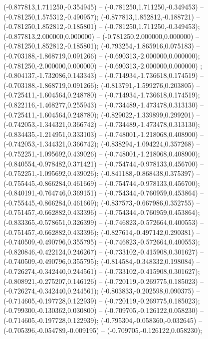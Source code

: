  (-0.877813,1.711250,-0.354945) -- (-0.781250,1.711250,-0.349453) -- (-0.781250,1.575312,-0.490957);
 (-0.877813,1.852812,-0.188721) -- (-0.781250,1.852812,-0.185801) -- (-0.781250,1.711250,-0.349453);
 (-0.877813,2.000000,0.000000) -- (-0.781250,2.000000,0.000000) -- (-0.781250,1.852812,-0.185801);
 (-0.793254,-1.865916,0.075183) -- (-0.703188,-1.868719,0.091266) -- (-0.690313,-2.000000,0.000000);
 (-0.781250,-2.000000,0.000000) -- (-0.690313,-2.000000,0.000000) ;
 (-0.804137,-1.732086,0.143343) -- (-0.714934,-1.736618,0.174519) -- (-0.703188,-1.868719,0.091266);
 (-0.813791,-1.599276,0.203805) -- (-0.725411,-1.604564,0.248780) -- (-0.714934,-1.736618,0.174519);
 (-0.822116,-1.468277,0.255943) -- (-0.734489,-1.473478,0.313130) -- (-0.725411,-1.604564,0.248780);
 (-0.829022,-1.339899,0.299201) -- (-0.742053,-1.344321,0.366742) -- (-0.734489,-1.473478,0.313130);
 (-0.834435,-1.214951,0.333103) -- (-0.748001,-1.218068,0.408900) -- (-0.742053,-1.344321,0.366742);
 (-0.838294,-1.094224,0.357268) -- (-0.752251,-1.095692,0.439026) -- (-0.748001,-1.218068,0.408900);
 (-0.840554,-0.978482,0.371421) -- (-0.754744,-0.978133,0.456700) -- (-0.752251,-1.095692,0.439026);
 (-0.841188,-0.868438,0.375397) -- (-0.755445,-0.866284,0.461669) -- (-0.754744,-0.978133,0.456700);
 (-0.840191,-0.764746,0.369151) -- (-0.754344,-0.760959,0.453864) -- (-0.755445,-0.866284,0.461669);
 (-0.837573,-0.667986,0.352755) -- (-0.751457,-0.662882,0.433396) -- (-0.754344,-0.760959,0.453864);
 (-0.833365,-0.578651,0.326399) -- (-0.746823,-0.572664,0.400553) -- (-0.751457,-0.662882,0.433396);
 (-0.827614,-0.497142,0.290381) -- (-0.740509,-0.490796,0.355795) -- (-0.746823,-0.572664,0.400553);
 (-0.820846,-0.422124,0.246267) -- (-0.733102,-0.415908,0.301627) -- (-0.740509,-0.490796,0.355795);
 (-0.814584,-0.348332,0.198084) -- (-0.726274,-0.342440,0.244561) -- (-0.733102,-0.415908,0.301627);
 (-0.808921,-0.275207,0.146126) -- (-0.720119,-0.269775,0.185023) -- (-0.726274,-0.342440,0.244561);
 (-0.803833,-0.202598,0.090375) -- (-0.714605,-0.197728,0.122939) -- (-0.720119,-0.269775,0.185023);
 (-0.799300,-0.130362,0.030800) -- (-0.709705,-0.126122,0.058230) -- (-0.714605,-0.197728,0.122939);
 (-0.795304,-0.058360,-0.032645) -- (-0.705396,-0.054789,-0.009195) -- (-0.709705,-0.126122,0.058230);
